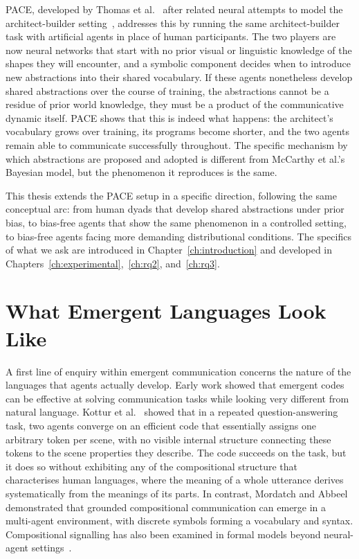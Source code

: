 PACE, developed by Thomas et al.~\cite{thomas_pace_2025} after related neural attempts to model the architect-builder setting~\cite{jergus2022multiagent}, addresses this by running the same architect-builder task with artificial agents in place of human participants. The two players are now neural networks that start with no prior visual or linguistic knowledge of the shapes they will encounter, and a symbolic component decides when to introduce new abstractions into their shared vocabulary. If these agents nonetheless develop shared abstractions over the course of training, the abstractions cannot be a residue of prior world knowledge, they must be a product of the communicative dynamic itself. PACE shows that this is indeed what happens: the architect's vocabulary grows over training, its programs become shorter, and the two agents remain able to communicate successfully throughout. The specific mechanism by which abstractions are proposed and adopted is different from McCarthy et al.'s Bayesian model, but the phenomenon it reproduces is the same.

This thesis extends the PACE setup in a specific direction, following the same conceptual arc: from human dyads that develop shared abstractions under prior bias, to bias-free agents that show the same phenomenon in a controlled setting, to bias-free agents facing more demanding distributional conditions. The specifics of what we ask are introduced in Chapter~\ref{ch:introduction} and developed in Chapters~\ref{ch:experimental},~\ref{ch:rq2}, and~\ref{ch:rq3}.

\section{What Emergent Languages Look Like}
\label{sec:bg-what-languages-look-like}

A first line of enquiry within emergent communication concerns the nature of the languages that agents actually develop. Early work showed that emergent codes can be effective at solving communication tasks while looking very different from natural language. Kottur et al.~\cite{kottur_natural_2017} showed that in a repeated question-answering task, two agents converge on an efficient code that essentially assigns one arbitrary token per scene, with no visible internal structure connecting these tokens to the scene properties they describe. The code succeeds on the task, but it does so without exhibiting any of the compositional structure that characterises human languages, where the meaning of a whole utterance derives systematically from the meanings of its parts. In contrast, Mordatch and Abbeel~\cite{mordatch_emergence_2017} demonstrated that grounded compositional communication can emerge in a multi-agent environment, with discrete symbols forming a vocabulary and syntax. Compositional signalling has also been examined in formal models beyond neural-agent settings~\cite{steinert-threlkeld_compositional_2016}.


